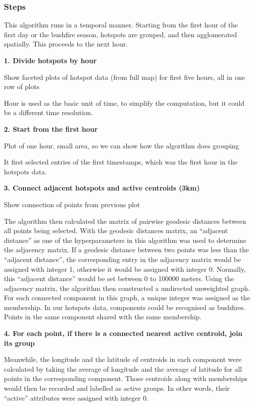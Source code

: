 \hypertarget{steps}{%
\subsubsection{Steps}\label{steps}}

This algorithm runs in a temporal manner. Starting from the first hour
of the first day or the bushfire season, hotspots are grouped, and then
agglomerated spatially. This proceeds to the next hour.

\textbf{1. Divide hotspots by hour}

Show faceted plots of hotspot data (from full map) for first five hours,
all in one row of plots

Hour is used as the basic unit of time, to simplify the computation, but
it could be a different time resolution.

\textbf{2. Start from the first hour}

Plot of one hour, small area, so we can show how the algorithm does
grouping

It first selected entries of the first timestamps, which was the first
hour in the hotspots data.

\textbf{3. Connect adjacent hotspots and active centroids (3km)}

Show connection of points from previous plot

The algorithm then calculated the matrix of pairwise geodesic distances
between all points being selected. With the geodesic distances matrix,
an ``adjacent distance'' as one of the hyperparameters in this algorithm
was used to determine the adjacency matrix. If a geodesic distance
between two points was less than the ``adjacent distance'', the
corresponding entry in the adjacency matrix would be assigned with
integer 1, otherwise it would be assigned with integer 0. Normally, this
``adjacent distance'' would be set between 0 to 100000 meters. Using the
adjacency matrix, the algorithm then constructed a undirected unweighted
graph. For each connected component in this graph, a unique integer was
assigned as the membership. In our hotspots data, components could be
recognised as bushfires. Points in the same component shared with the
same membership.

\textbf{4. For each point, if there is a connected nearest active
centroid, join its group}

Meanwhile, the longitude and the latitude of centroids in each component
were calculated by taking the average of longitude and the average of
latitude for all points in the corresponding component. Those centroids
along with memberships would then be recorded and labelled as active
groups. In other words, their ``active'' attributes were assigned with
integer 0.

